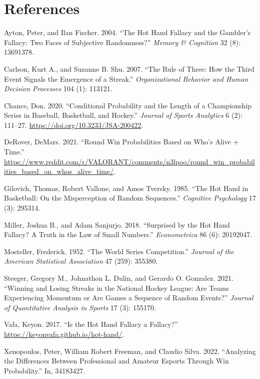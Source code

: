 \documentclass{article}
\newlength{\cslhangindent}
\newlength{\cslentryspacingunit} %
\newenvironment{CSLReferences}[2] %
 {%
  \setlength{\parindent}{0pt}
  \ifodd #1
  \let\oldpar\par
  \def\par{\hangindent=\cslhangindent\oldpar}
  \fi
  \setlength{\parskip}{#2\cslentryspacingunit}
 }%
 {}
\begin{document}
\hypertarget{references}{%
\section*{References}\label{references}}

\hypertarget{refs}{}
\begin{CSLReferences}{1}{0}
\leavevmode{}%
Ayton, Peter, and Ilan Fischer. 2004. {``The Hot Hand Fallacy and the
Gambler{'}s Fallacy: Two Faces of Subjective Randomness?''} \emph{Memory
\& Cognition} 32 (8): 13691378.

\leavevmode{}%
Carlson, Kurt A., and Suzanne B. Shu. 2007. {``The Rule of Three: How
the Third Event Signals the Emergence of a Streak.''}
\emph{Organizational Behavior and Human Decision Processes} 104 (1):
113121.

\leavevmode{}%
Chance, Don. 2020. {``Conditional Probability and the Length of a
Championship Series in Baseball, Basketball, and Hockey.''}
\emph{Journal of Sports Analytics} 6 (2): 111--27.
\url{https://doi.org/10.3233/JSA-200422}.

\leavevmode{}%
DeRover, DeMars. 2021. {``Round Win Probabilities Based on Who's Alive +
Time.''}
\url{https://www.reddit.com/r/VALORANT/comments/n3lpoo/round_win_probabilities_based_on_whos_alive_time/}.

\leavevmode{}%
Gilovich, Thomas, Robert Vallone, and Amos Tversky. 1985. {``The Hot
Hand in Basketball: On the Misperception of Random Sequences.''}
\emph{Cognitive Psychology} 17 (3): 295314.

\leavevmode{}%
Miller, Joshua B., and Adam Sanjurjo. 2018. {``Surprised by the Hot Hand
Fallacy? A Truth in the Law of Small Numbers.''} \emph{Econometrica} 86
(6): 20192047.

\leavevmode{}%
Mosteller, Frederick. 1952. {``The World Series Competition.''}
\emph{Journal of the American Statistical Association} 47 (259): 355380.

\leavevmode{}%
Steeger, Gregory M., Johnathon L. Dulin, and Gerardo O. Gonzalez. 2021.
{``Winning and Losing Streaks in the National Hockey League: Are Teams
Experiencing Momentum or Are Games a Sequence of Random Events?''}
\emph{Journal of Quantitative Analysis in Sports} 17 (3): 155170.

\leavevmode{}%
Vafa, Keyon. 2017. {``Is the Hot Hand Fallacy a Fallacy?''}
\url{https://keyonvafa.github.io/hot-hand/}.

\leavevmode{}%
Xenopoulos, Peter, William Robert Freeman, and Claudio Silva. 2022.
{``Analyzing the Differences Between Professional and Amateur Esports
Through Win Probability.''} In, 34183427.

\end{CSLReferences}



\end{document}
